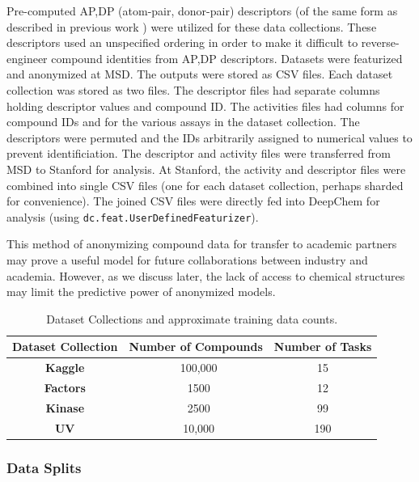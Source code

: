 Pre-computed AP,DP (atom-pair, donor-pair) descriptors \cite{carhart1985atom,kearsley1996chemical} (of the same form as described in previous work \cite{ma2015deep}) were utilized
for these data collections. These descriptors used an unspecified ordering in order to make it difficult to reverse-engineer compound identities from AP,DP descriptors. Datasets were featurized and anonymized at MSD. The outputs were stored as CSV files. Each dataset collection was stored as two files. The descriptor files had separate columns holding descriptor values and compound ID. The activities files had columns for compound IDs and for the various assays in the dataset collection. The descriptors were permuted and the IDs arbitrarily assigned to numerical values to prevent identificiation. The descriptor and activity files were transferred from MSD to Stanford for analysis. At Stanford, the activity and descriptor files were combined into single CSV files (one for each dataset collection, perhaps sharded for convenience). The joined CSV files were directly fed into DeepChem for analysis (using \texttt{dc.feat.UserDefinedFeaturizer}).


This method of anonymizing compound data for transfer to academic partners may prove a useful model for future collaborations between industry and academia. However, as we discuss later, the lack of access to chemical structures may limit the predictive power of anonymized models.

\begin{table}[h]
    \centering
    \begin{tabular}{ |c|c|c| } 
    \hline
     Dataset Collection & Number of Compounds & Number of Tasks \\ 
    \hline
    \textbf{Kaggle} & ~100,000 & 15  \\
    \hline
    \textbf{Factors} & ~1500 & 12  \\
    \hline
    \textbf{Kinase} & ~2500 & 99  \\
    \hline
    \textbf{UV} & ~10,000 & 190 \\
    \hline
    \end{tabular}
    \caption{Dataset Collections and approximate training data counts.}
    \label{tab:datasets}
\end{table}

\subsubsection{Data Splits}

